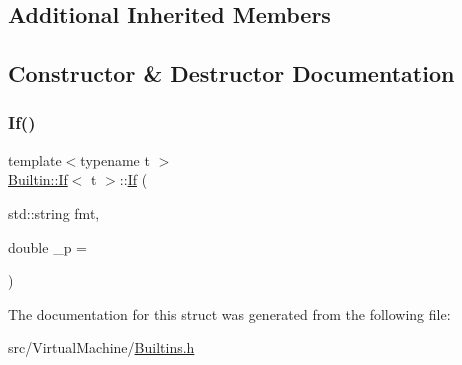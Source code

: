 \subsection*{Additional Inherited Members}


\subsection{Constructor \& Destructor Documentation}
\mbox{\label{struct_builtin_1_1_if_a4ea649fb18a5c42445c5c48e8549c951}} 
\subsubsection{\texorpdfstring{If()}{If()}}
{\footnotesize\ttfamily template$<$typename t $>$ \\
\hyperlink{struct_builtin_1_1_if}{Builtin\+::\+If}$<$ t $>$\+::\hyperlink{struct_builtin_1_1_if}{If} (\begin{DoxyParamCaption}\item[{std\+::string}]{fmt,  }\item[{double}]{\+\_\+p = {} }\end{DoxyParamCaption})\hspace{0.3cm}{\ttfamily [inline]}}



The documentation for this struct was generated from the following file\+:\begin{DoxyCompactItemize}
\item 
src/\+Virtual\+Machine/\hyperlink{_builtins_8h}{Builtins.\+h}\end{DoxyCompactItemize}
